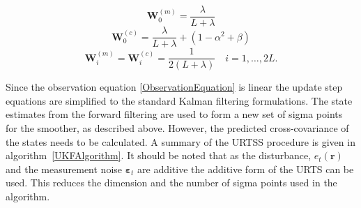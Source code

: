 \documentclass[12pt]{iopart}
\begin{document}
\begin{equation}
	\mathbf W_0^{(m)}=\frac{\lambda}{ L+\lambda} 
\end{equation}
\begin{equation}
	\mathbf W_0^{(c)}=\frac{\lambda}{ L+\lambda}+(1-\alpha^2+\beta) 
\end{equation}
\begin{equation}
	\mathbf W_i^{(m)}=\mathbf W_i^{(c)}=\frac{1}{2( L+\lambda)} \quad i=1, \dots, 2L. 
\end{equation}

Since the observation equation \ref{ObservationEquation} is linear the update step equations are simplified to the standard Kalman filtering formulations. The state estimates from the forward filtering are used to form a new set of sigma points for the smoother, as described above. However, the predicted cross-covariance of the states needs to be calculated. A summary of the URTSS procedure is given in algorithm~\ref{UKFAlgorithm}. It should be noted that as the disturbance, $e_t\left(\mathbf{r}\right)$ and the measurement noise $ \boldsymbol{\varepsilon}_t$ are additive the additive form of the URTS can be used. This reduces the dimension and the number of sigma points used in the algorithm.
\end{document}

